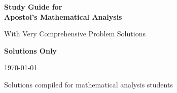\documentclass[openany]{book}
\newif\ifshowproblems
\begin{document}
\begin{titlepage}
    \centering
    \vspace*{2cm}
    
    
    \vspace{2cm}
    
    {\Huge\bfseries Study Guide for\\[0.5cm] Apostol's Mathematical Analysis}
    
    \vspace{1cm}
    
    {\Large With Very Comprehensive Problem Solutions}
    
    \vspace{0.5cm}
    
    \ifshowproblems
        {\Large \textbf{With Problem Statements}}
    \else
        {\Large \textbf{Solutions Only}}
    \fi
    
    \vspace{2cm}
    
    {\large \today}
    
    \vfill
    
    {\large Solutions compiled for mathematical analysis students}
    
    \vspace{1cm}
\end{titlepage}

\tableofcontents

% 
% 
% 

% 
% 
% 
% 
% 
% 
% 
% 
% 
% 
% 
% 

\end{document}
